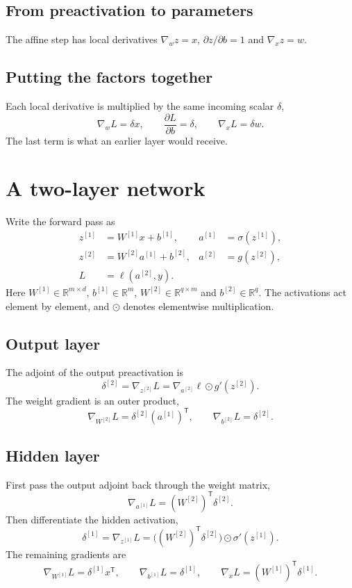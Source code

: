\documentclass[11pt,a4paper]{article}
\newcommand{\R}{\mathbb{R}}
\newcommand{\T}{\mathsf{T}}
\begin{document}
\subsection{From preactivation to parameters}
The affine step has local derivatives $\nabla_w z=x$,
$\partial z/\partial b=1$ and $\nabla_x z=w$.

\subsection{Putting the factors together}
Each local derivative is multiplied by the same incoming scalar $\delta$,
\[
\nabla_w L=\delta x,\qquad
\frac{\partial L}{\partial b}=\delta,\qquad
\nabla_x L=\delta w.
\]
The last term is what an earlier layer would receive.

\section{A two-layer network}
Write the forward pass as
\begin{align*}
z^{[1]} &= W^{[1]}x+b^{[1]}, & a^{[1]} &= \sigma(z^{[1]}),\\
z^{[2]} &= W^{[2]}a^{[1]}+b^{[2]}, & a^{[2]} &= g(z^{[2]}),\\
L &= \ell(a^{[2]},y).
\end{align*}
Here $W^{[1]}\in\R^{m\times d}$, $b^{[1]}\in\R^m$,
$W^{[2]}\in\R^{q\times m}$ and $b^{[2]}\in\R^q$.
The activations act element by element, and $\odot$ denotes
elementwise multiplication.

\subsection{Output layer}
The adjoint of the output preactivation is
\[
\delta^{[2]}=\nabla_{z^{[2]}}L=\nabla_{a^{[2]}}\ell\odot g'(z^{[2]}).
\]
The weight gradient is an outer product,
\[
\nabla_{W^{[2]}}L=\delta^{[2]}(a^{[1]})^\T,\qquad
\nabla_{b^{[2]}}L=\delta^{[2]}.
\]

\subsection{Hidden layer}
First pass the output adjoint back through the weight matrix,
\[
\nabla_{a^{[1]}}L=(W^{[2]})^\T\delta^{[2]}.
\]
Then differentiate the hidden activation,
\[
\delta^{[1]}=\nabla_{z^{[1]}}L
=\big((W^{[2]})^\T\delta^{[2]}\big)\odot\sigma'(z^{[1]}).
\]
The remaining gradients are
\[
\nabla_{W^{[1]}}L=\delta^{[1]}x^\T,\qquad
\nabla_{b^{[1]}}L=\delta^{[1]},\qquad
\nabla_x L=(W^{[1]})^\T\delta^{[1]}.
\]
\end{document}
